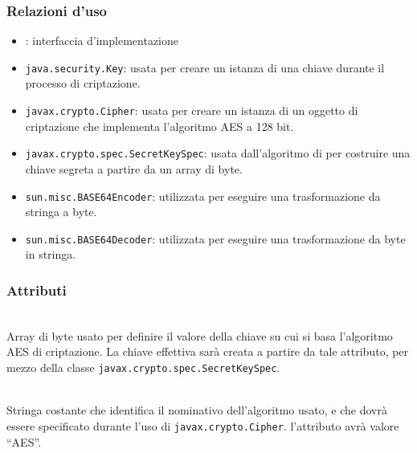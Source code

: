 \subsubsection*{Relazioni d'uso}
\begin{itemize}
	\item {}: interfaccia d'implementazione
	\item \texttt{java.security.Key}: usata per creare un istanza di una chiave durante il processo di criptazione.
	\item \texttt{javax.crypto.Cipher}: usata per creare un istanza di un oggetto di criptazione che implementa l'algoritmo AES a 128 bit.
	\item \texttt{javax.crypto.spec.SecretKeySpec}: usata dall'algoritmo di per costruire una chiave segreta a partire da un array di byte.
	\item \texttt{sun.misc.BASE64Encoder}: utilizzata per eseguire una trasformazione da stringa a byte.
	\item \texttt{sun.misc.BASE64Decoder}: utilizzata per eseguire una trasformazione da byte in stringa.
\end{itemize}

\subsubsection*{Attributi}
\begin{description}
  \item{}\\
  Array di byte usato per definire il valore della chiave su cui si basa l'algoritmo AES di criptazione. La chiave effettiva sarà creata a partire da tale attributo, per mezzo della classe \texttt{javax.crypto.spec.SecretKeySpec}.
  \item{}\\
  Stringa costante che identifica il nominativo dell'algoritmo usato, e che dovrà essere specificato durante l'uso di \texttt{javax.crypto.Cipher}. l'attributo avrà valore ``AES''.
\end{description}

